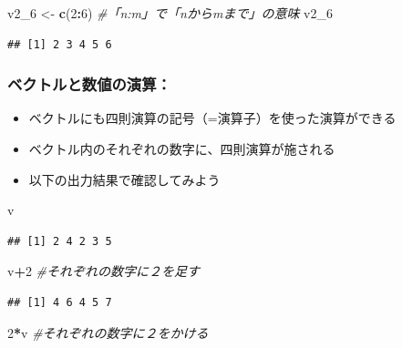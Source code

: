 \documentclass[
]{book}
\newenvironment{Shaded}{\begin{snugshade}}{\end{snugshade}}
\newcommand{\CommentTok}[1]{\textcolor[rgb]{0.56,0.35,0.01}{\textit{#1}}}
\newcommand{\DecValTok}[1]{\textcolor[rgb]{0.00,0.00,0.81}{#1}}
\newcommand{\FunctionTok}[1]{\textcolor[rgb]{0.13,0.29,0.53}{\textbf{#1}}}
\newcommand{\NormalTok}[1]{#1}
\newcommand{\OtherTok}[1]{\textcolor[rgb]{0.56,0.35,0.01}{#1}}
\newcommand{\SpecialCharTok}[1]{\textcolor[rgb]{0.81,0.36,0.00}{\textbf{#1}}}
\providecommand{\tightlist}{%
  \setlength{\itemsep}{0pt}\setlength{\parskip}{0pt}}
\begin{document}
\begin{Shaded}
\begin{Highlighting}[]
\NormalTok{v2\_6 }\OtherTok{\textless{}{-}} \FunctionTok{c}\NormalTok{(}\DecValTok{2}\SpecialCharTok{:}\DecValTok{6}\NormalTok{) }\CommentTok{\#「n:m」で「nからmまで」の意味}
\NormalTok{v2\_6}
\end{Highlighting}
\end{Shaded}

\begin{verbatim}
## [1] 2 3 4 5 6
\end{verbatim}

\hypertarget{ux30d9ux30afux30c8ux30ebux3068ux6570ux5024ux306eux6f14ux7b97}{%
\subsubsection*{ベクトルと数値の演算：}\label{ux30d9ux30afux30c8ux30ebux3068ux6570ux5024ux306eux6f14ux7b97}}

\begin{itemize}
\tightlist
\item
  ベクトルにも四則演算の記号（=演算子）を使った演算ができる
\item
  ベクトル内のそれぞれの数字に、四則演算が施される
\item
  以下の出力結果で確認してみよう
\end{itemize}

\begin{Shaded}
\begin{Highlighting}[]
\NormalTok{v}
\end{Highlighting}
\end{Shaded}

\begin{verbatim}
## [1] 2 4 2 3 5
\end{verbatim}

\begin{Shaded}
\begin{Highlighting}[]
\NormalTok{v}\SpecialCharTok{+}\DecValTok{2}  \CommentTok{\#それぞれの数字に２を足す }
\end{Highlighting}
\end{Shaded}

\begin{verbatim}
## [1] 4 6 4 5 7
\end{verbatim}

\begin{Shaded}
\begin{Highlighting}[]
\DecValTok{2}\SpecialCharTok{*}\NormalTok{v  }\CommentTok{\#それぞれの数字に２をかける  }
\end{Highlighting}
\end{Shaded}
\end{document}
